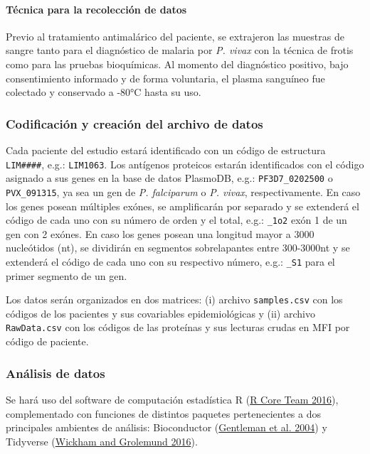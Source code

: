 \documentclass[
  a4paper]{article}
\begin{document}
\hypertarget{tuxe9cnica-para-la-recolecciuxf3n-de-datos}{%
\paragraph{Técnica para la recolección de
datos}\label{tuxe9cnica-para-la-recolecciuxf3n-de-datos}}

Previo al tratamiento antimalárico del paciente, se extrajeron las
muestras de sangre tanto para el diagnóstico de malaria por \emph{P.
vivax} con la técnica de frotis como para las pruebas bioquímicas. Al
momento del diagnóstico positivo, bajo consentimiento informado y de
forma voluntaria, el plasma sanguíneo fue colectado y conservado a -80°C
hasta su uso.

\hypertarget{codificaciuxf3n-y-creaciuxf3n-del-archivo-de-datos}{%
\subsubsection{Codificación y creación del archivo de
datos}\label{codificaciuxf3n-y-creaciuxf3n-del-archivo-de-datos}}

Cada paciente del estudio estará identificado con un código de
estructura \texttt{LIM\#\#\#\#}, e.g.: \texttt{LIM1063}. Los antígenos
proteicos estarán identificados con el código asignado a sus genes en la
base de datos PlasmoDB, e.g.: \texttt{PF3D7\_0202500} o
\texttt{PVX\_091315}, ya sea un gen de \emph{P. falciparum} o \emph{P.
vivax}, respectivamente. En caso los genes posean múltiples exónes, se
amplificarán por separado y se extenderá el código de cada uno con su
número de orden y el total, e.g.: \texttt{\_1o2} exón 1 de un gen con 2
exónes. En caso los genes posean una longitud mayor a 3000 nucleótidos
(nt), se dividirán en segmentos sobrelapantes entre 300-3000nt y se
extenderá el código de cada uno con su respectivo número, e.g.:
\texttt{\_S1} para el primer segmento de un gen.

Los datos serán organizados en dos matrices: (i) archivo
\texttt{samples.csv} con los códigos de los pacientes y sus covariables
epidemiológicas y (ii) archivo \texttt{RawData.csv} con los códigos de
las proteínas y sus lecturas crudas en MFI por código de paciente.

\hypertarget{anadata}{%
\subsubsection{Análisis de datos}\label{anadata}}

Se hará uso del software de computación estadística R
(\protect\hyperlink{ref-R2016}{R Core Team 2016}), complementado con
funciones de distintos paquetes pertenecientes a dos principales
ambientes de análisis: Bioconductor
(\protect\hyperlink{ref-bioconductor2004}{Gentleman et al. 2004}) y
Tidyverse (\protect\hyperlink{ref-wickham2016r4ds}{Wickham and Grolemund
2016}).
\end{document}
